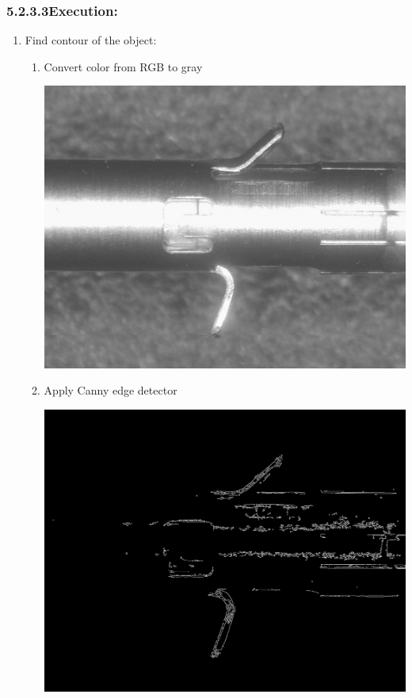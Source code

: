 \subsubsection*{5.2.3.3\hspace{0.5cm}Execution:}
\begin{enumerate}
\item Find contour of the object:
\begin{enumerate}
\item Convert color from RGB to gray
\begin{center}
\includegraphics[width=\textwidth]{grayed.png}
\end{center}
\pagebreak
\item Apply Canny edge detector
\begin{center}
\includegraphics[width=\textwidth]{edged.png}

\end{center}
\end{enumerate}
\end{enumerate}
